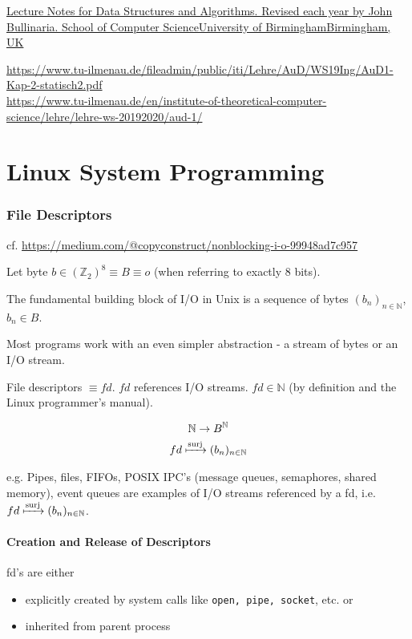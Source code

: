 \documentclass[10pt]{amsart}
\begin{document}
\begin{multicols*}{2}
\href{https://www.cs.bham.ac.uk/~jxb/DSA/dsa.pdf}{Lecture Notes for Data Structures and Algorithms. Revised each year by John Bullinaria. School of Computer ScienceUniversity of BirminghamBirmingham, UK}

\url{https://www.tu-ilmenau.de/fileadmin/public/iti/Lehre/AuD/WS19Ing/AuD1-Kap-2-statisch2.pdf} \\
\url{https://www.tu-ilmenau.de/en/institute-of-theoretical-computer-science/lehre/lehre-ws-20192020/aud-1/} \\


\part{Linux System Programming}

\section{File Descriptors}

cf. \url{https://medium.com/@copyconstruct/nonblocking-i-o-99948ad7c957}

Let byte $b \in (\mathbb{Z}_2)^8 \equiv B \equiv o$ (when referring to exactly 8 bits).

The fundamental building block of I/O in Unix is a sequence of bytes $(b_n)_{n\in \mathbb{N}}$, $b_n \in B$. 

Most programs work with an even simpler abstraction - a stream of bytes or an I/O stream.

File descriptors $\equiv fd$. $fd$ references I/O streams.  $fd \in \mathbb{N}$ (by definition and the Linux programmer's manual).

\[
\begin{gathered}
\mathbb{N} \to B^{\mathbb{N}} \\
fd \xmapsto{\text{surj}} (b_n)_{n \in \mathbb{N}}
\end{gathered}
\]

e.g. Pipes, files, FIFOs, POSIX IPC's (message queues, semaphores, shared memory), event queues are examples of I/O streams referenced by a fd, i.e. $fd \xmapsto{\text{surj}} (b_n)_{n \in \mathbb{N}}$.

\subsection{Creation and Release of Descriptors}

fd's are either 
\begin{itemize}
	\item explicitly created by system calls like \texttt{open, pipe, socket}, etc. or 
	\item inherited from parent process
\end{itemize}


\end{multicols*}
\end{document}
